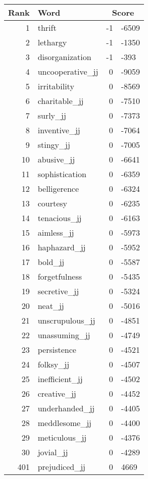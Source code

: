 \begin{longtable}[!htbp]{| rlr@{.}l |}
    \hline
    \textbf{Rank} & \textbf{Word} & \multicolumn{2}{c|}{\textbf{Score}} \\
    \hline
    \endhead
    1 & thrift & -1 & -6509 \\
    2 & lethargy & -1 & -1350 \\
    3 & disorganization & -1 & -393 \\
    4 & uncooperative\_jj & 0 & -9059 \\
    5 & irritability & 0 & -8569 \\
    6 & charitable\_jj & 0 & -7510 \\
    7 & surly\_jj & 0 & -7373 \\
    8 & inventive\_jj & 0 & -7064 \\
    9 & stingy\_jj & 0 & -7005 \\
    10 & abusive\_jj & 0 & -6641 \\
    11 & sophistication & 0 & -6359 \\
    12 & belligerence & 0 & -6324 \\
    13 & courtesy & 0 & -6235 \\
    14 & tenacious\_jj & 0 & -6163 \\
    15 & aimless\_jj & 0 & -5973 \\
    16 & haphazard\_jj & 0 & -5952 \\
    17 & bold\_jj & 0 & -5587 \\
    18 & forgetfulness & 0 & -5435 \\
    19 & secretive\_jj & 0 & -5324 \\
    20 & neat\_jj & 0 & -5016 \\
    21 & unscrupulous\_jj & 0 & -4851 \\
    22 & unassuming\_jj & 0 & -4749 \\
    23 & persistence & 0 & -4521 \\
    24 & folksy\_jj & 0 & -4507 \\
    25 & inefficient\_jj & 0 & -4502 \\
    26 & creative\_jj & 0 & -4452 \\
    27 & underhanded\_jj & 0 & -4405 \\
    28 & meddlesome\_jj & 0 & -4400 \\
    29 & meticulous\_jj & 0 & -4376 \\
    30 & jovial\_jj & 0 & -4289 \\
    401 & prejudiced\_jj & 0 & 4669 \\

\end{longtable}
